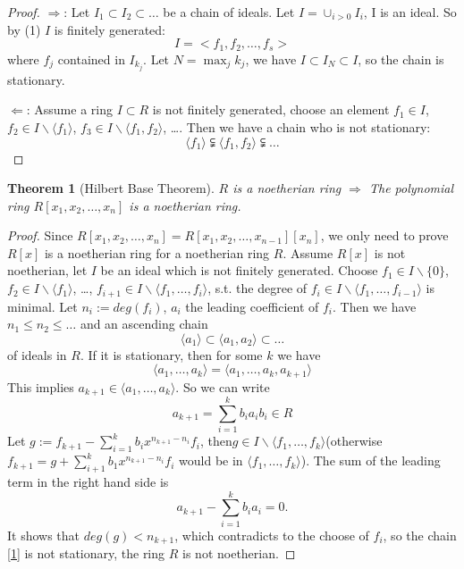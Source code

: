 \documentclass{amsart}
\theoremstyle{plain}
\newtheorem{theorem}{Theorem}
\theoremstyle{definition}
\theoremstyle{remark}
\numberwithin{equation}{section}
\begin{document}
\begin{proof}
	$ \Rightarrow $: Let $ I_1\subset I_2\subset\dots  $ be a chain of ideals. Let $ I=\cup_{i>0} I_i $, I is an ideal. So by (1) $ I $ is finitely generated:
	$$ I=<f_1, f_2, \dots, f_s> $$
	where $ f_j $ contained in $ I_{k_j} $. Let $ N = \max_{j}k_j $, we have $ I\subset I_N\subset I $, so the chain is stationary.
	
	$ \Leftarrow $: Assume a ring $ I\subset R $ is not finitely generated, choose an element $ f_1\in I $, $ f_2\in I\backslash\langle f_1\rangle $, $ f_3\in I\backslash \langle f_1, f_2 \rangle $, \dots.
	Then we have a chain who is not stationary:
	$$
	\langle f_1\rangle \subsetneqq \langle f_1, f_2\rangle \subsetneqq \dots
	$$
	 
\end{proof}
\begin{theorem}[Hilbert Base Theorem]
	$ R $ is a noetherian ring $ \Rightarrow $ The polynomial ring $ R[x_1, x_2, \dots, x_n] $ is a noetherian ring.
\end{theorem}
\begin{proof}
	Since $ R[x_1,x_2,\dots,x_n] = R[x_1,x_2,\dots,x_{n-1}][x_n] $, we only need to prove $ R[x] $ is a noetherian ring for a noetherian ring $ R $.
	Assume $ R[x] $ is not noetherian, let $ I $ be an ideal which is not finitely generated. Choose $ f_1\in I\backslash \{ 0\} $, $ f_2\in I\backslash \langle f_1\rangle $, \dots, $ f_{i+1}\in I\backslash \langle f_1,\dots,f_i\rangle $, s.t. the degree of $ f_i \in I\backslash \langle f_1,\dots,f_{i-1}\rangle $ is minimal.
	Let $ n_i:= deg(f_i) $, $ a_i $ the leading coefficient of $ f_i $. Then we have $ n_1\leq n_2\leq \dots $ and an ascending chain 
	\begin{equation}
			\langle a_1\rangle \subset \langle a_1, a_2 \rangle \subset \dots \label{1}
	\end{equation}
	of ideals in $ R $.
	If it is stationary, then for some $ k $ we have 
	$$
	\langle a_1,\dots,a_k\rangle = \langle a_1,\dots,a_k,a_{k+1}\rangle
	$$
	This implies $ a_{k+1}\in \langle a_1,\dots,a_k\rangle $. So we can write
	\begin{equation}
		a_{k+1}=\sum_{i=1}^{k} b_i a_i b_i\in R
	\end{equation}
	Let $ g:=f_{k+1}-\sum_{i=1}^{k}b_ix^{n_{k+1}-n_i}f_i $, then$ g\in I\backslash \langle f_1,\dots,f_k\rangle $(otherwise $ f_{k+1}=g+\sum_{i+1}^{k}b_1x^{n_{k+1}-n_i}f_i $ would be in $ \langle f_1,\dots,f_k\rangle $). The sum of the leading term in the right hand side is 
	$$
	a_{k+1}-\sum_{i=1}^{k}b_ia_i=0.
	$$
	It shows that $ deg(g)<n_{k+1} $, which contradicts to the choose of $ f_i $, so the chain \ref{1} is not stationary, the ring $ R $ is not noetherian.
\end{proof}
\end{document}
